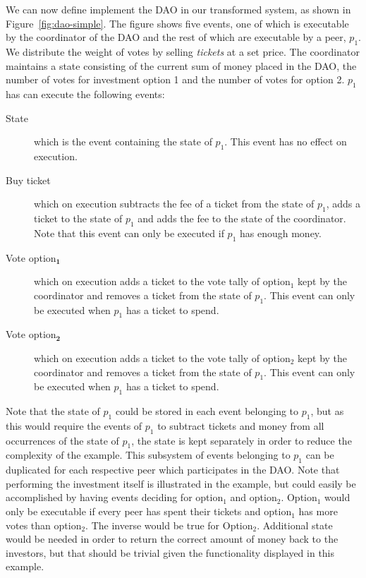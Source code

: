 \documentclass{article}
\begin{document}
	We can now define implement the DAO in our transformed system, as shown in Figure~\ref{fig:dao-simple}.
	The figure shows five events, one of which is executable by the coordinator of the DAO and the rest of which are executable by a peer, $p_1$.
	We distribute the weight of votes by selling \textit{tickets} at a set price.
	The coordinator maintains a state consisting of the current sum of money placed in the DAO, the number of votes for investment option 1 and the number of votes for option 2.
	$p_1$ has can execute the following events:
	\begin{description}
		\item[State] which is the event containing the state of $p_1$. This event has no effect on execution.
		\item[Buy ticket] which on execution subtracts the fee of a ticket from the state of $p_1$, adds a ticket to the state of $p_1$ and adds the fee to the state of the coordinator.
		Note that this event can only be executed if $p_1$ has enough money.
		\item[Vote option$_\textbf{1}$] which on execution adds a ticket to the vote tally of option$_1$ kept by the coordinator and removes a ticket from the state of $p_1$.
		This event can only be executed when $p_1$ has a ticket to spend.
		\item[Vote option$_\textbf{2}$] which on execution adds a ticket to the vote tally of option$_2$ kept by the coordinator and removes a ticket from the state of $p_1$.
		This event can only be executed when $p_1$ has a ticket to spend.
	\end{description}
	Note that the state of $p_1$ could be stored in each event belonging to $p_1$, but as this would require the events of $p_1$ to subtract tickets and money from all occurrences of the state of $p_1$, the state is kept separately in order to reduce the complexity of the example.
	This subsystem of events belonging to $p_1$ can be duplicated for each respective peer which participates in the DAO.
	Note that performing the investment itself is illustrated in the example, but could easily be accomplished by having events deciding for option$_1$ and option$_2$.
	Option$_1$ would only be executable if every peer has spent their tickets and option$_1$ has more votes than option$_2$.
	The inverse would be true for Option$_2$.
	Additional state would be needed in order to return the correct amount of money back to the investors, but that should be trivial given the functionality displayed in this example.
\end{document}
